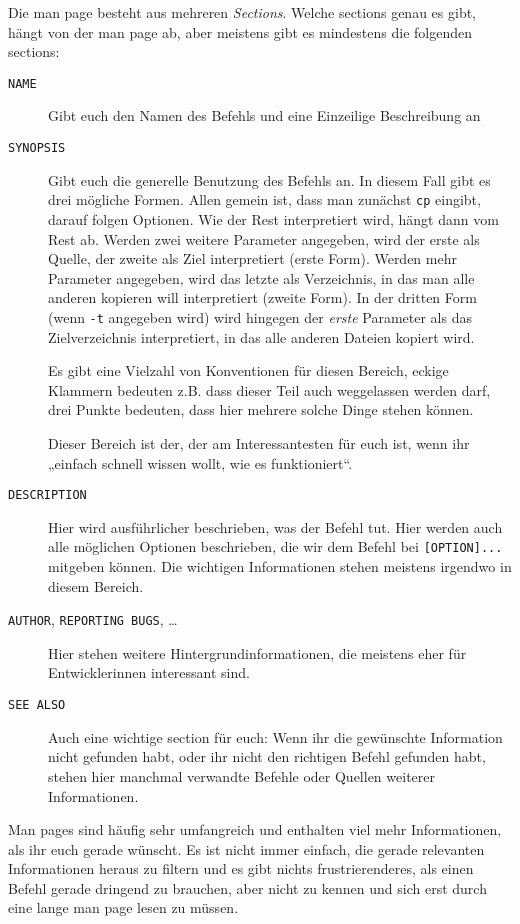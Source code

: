 Die man page besteht aus mehreren \emph{Sections}. Welche sections genau es
gibt, hängt von der man page ab, aber meistens gibt es mindestens die folgenden
sections:
\begin{description}
	\item[\texttt{NAME}]
	      Gibt euch den Namen des Befehls und eine Einzeilige Beschreibung an
	\item[\texttt{SYNOPSIS}]
	      Gibt euch die generelle Benutzung des Befehls an. In diesem Fall gibt
	      es drei mögliche Formen. Allen gemein ist, dass man zunächst
	      \texttt{cp} eingibt, darauf folgen Optionen. Wie der Rest interpretiert
	      wird, hängt dann vom Rest ab. Werden zwei weitere Parameter angegeben,
	      wird der erste als Quelle, der zweite als Ziel interpretiert (erste
	      Form). Werden mehr Parameter angegeben, wird das letzte als
	      Verzeichnis, in das man alle anderen kopieren will interpretiert
	      (zweite Form). In der dritten Form (wenn \texttt{-t} angegeben wird)
	      wird hingegen der \emph{erste} Parameter als das Zielverzeichnis
	      interpretiert, in das alle anderen Dateien kopiert wird.

	      Es gibt eine Vielzahl von Konventionen für diesen Bereich, eckige
	      Klammern bedeuten z.B. dass dieser Teil auch weggelassen werden darf,
	      drei Punkte bedeuten, dass hier mehrere solche Dinge stehen können.

	      Dieser Bereich ist der, der am Interessantesten für euch ist, wenn ihr
	      „einfach schnell wissen wollt, wie es funktioniert“.
	\item[\texttt{DESCRIPTION}]
	      Hier wird ausführlicher beschrieben, was der Befehl tut. Hier werden
	      auch alle möglichen Optionen beschrieben, die wir dem Befehl bei
	      \texttt{[OPTION]...} mitgeben können. Die wichtigen Informationen
	      stehen meistens irgendwo in diesem Bereich.
	\item[\texttt{AUTHOR}, \texttt{REPORTING BUGS}, \dots]
	      Hier stehen weitere Hintergrundinformationen, die meistens eher für
	      Entwicklerinnen interessant sind.
	\item[\texttt{SEE ALSO}]
	      Auch eine wichtige section für euch: Wenn ihr die gewünschte
	      Information nicht gefunden habt, oder ihr nicht den richtigen Befehl
	      gefunden habt, stehen hier manchmal verwandte Befehle oder Quellen
	      weiterer Informationen.
\end{description}

Man pages sind häufig sehr umfangreich und enthalten viel mehr Informationen,
als ihr euch gerade wünscht. Es ist nicht immer einfach, die gerade relevanten
Informationen heraus zu filtern und es gibt nichts frustrierenderes, als einen
Befehl gerade dringend zu brauchen, aber nicht zu kennen und sich erst durch
eine lange man page lesen zu müssen.


